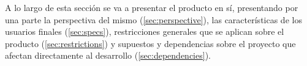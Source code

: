 A lo largo de esta sección se va a presentar el producto en sí, presentando por una
parte la perspectiva del mismo (\ref{sec:perspective}), las características de
los usuarios finales (\ref{sec:specs}), restricciones generales que se aplican sobre
el producto (\ref{sec:restrictions}) y supuestos y dependencias sobre el proyecto
que afectan directamente al desarrollo (\ref{sec:dependencies}).